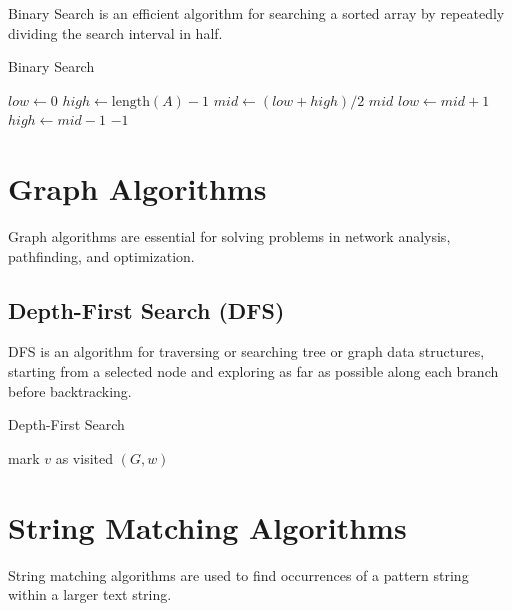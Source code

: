 Binary Search is an efficient algorithm for searching a sorted array by
repeatedly dividing the search interval in half.

\begin{algorithm}
\caption{Binary Search}
\begin{algorithmic}
    \STATE $low \gets 0$
    \STATE $high \gets \text{length}(A) - 1$
        \STATE $mid \gets (low + high) / 2$
            \RETURN $mid$
            \STATE $low \gets mid + 1$
        \ELSE
            \STATE $high \gets mid - 1$
        \ENDIF
    \ENDWHILE
    \RETURN $-1$
\ENDPROCEDURE
\end{algorithmic}
\end{algorithm}

\section{Graph Algorithms}

Graph algorithms are essential for solving problems in network analysis,
pathfinding, and optimization.

\subsection{Depth-First Search (DFS)}

DFS is an algorithm for traversing or searching tree or graph data
structures, starting from a selected node and exploring as far as
possible along each branch before backtracking.

\begin{algorithm}
\caption{Depth-First Search}
\begin{algorithmic}
    \STATE mark $v$ as visited
            \STATE {}$(G, w)$
        \ENDIF
    \ENDFOR
\ENDPROCEDURE
\end{algorithmic}
\end{algorithm}

\section{String Matching Algorithms}

String matching algorithms are used to find occurrences of a pattern
string within a larger text string.

